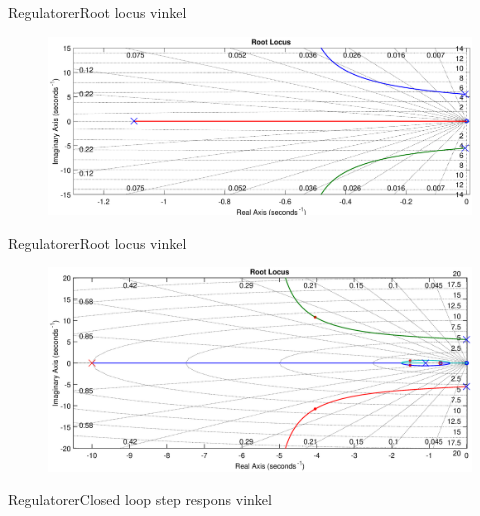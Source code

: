 \begin{frame}{Regulatorer}{Root locus vinkel}
\vspace{1cm}
\begin{figure}[H]
\centering
\includegraphics[width=1\textwidth]{billeder/Thomas/AngleConRL11}
\end{figure}
\end{frame}


\begin{frame}{Regulatorer}{Root locus vinkel}
\vspace{1cm}
\begin{figure}[H]
\centering
\includegraphics[width=1\textwidth]{Billeder/Thomas/AngleOpenLoop}
\end{figure}
\end{frame}

\begin{frame}{Regulatorer}{Closed loop step respons vinkel}
\begin{figure}[H]
\vspace{1.5cm}
\centering

\end{figure}
\end{frame}

